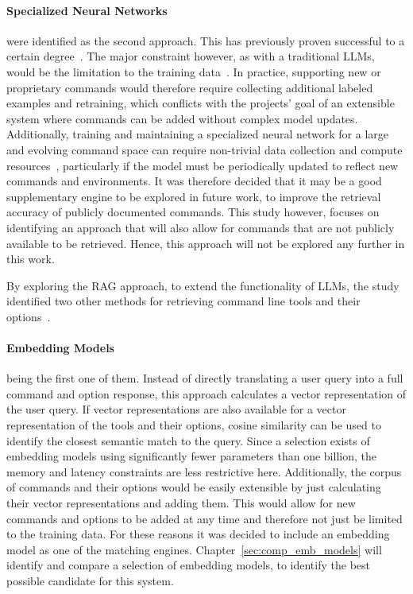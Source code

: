 \paragraph{Specialized Neural Networks} were identified as the second approach. This has previously proven successful to a certain degree~\cite{agarwal2021neurips}. The major constraint however, as with a traditional \acp{LLM}, would be the limitation to the training data~\cite{10488711}. In practice, supporting new or proprietary commands would therefore require collecting additional labeled examples and retraining, which conflicts with the projects' goal of an extensible system where commands can be added without complex model updates. Additionally, training and maintaining a specialized neural network for a large and evolving command space can require non-trivial data collection and compute resources~\cite{thompson2020computational}, particularly if the model must be periodically updated to reflect new commands and environments. It was therefore decided that it may be a good supplementary engine to be explored in future work, to improve the retrieval accuracy of publicly documented commands. This study however, focuses on identifying an approach that will also allow for commands that are not publicly available to be retrieved. Hence, this approach will not be explored any further in this work.

By exploring the \ac{RAG} approach, to extend the functionality of \acp{LLM}, the study identified two other methods for retrieving command line tools and their options~\cite{aljohani2026enhancing,baban2025optimizing}. 

\paragraph{Embedding Models} being the first one of them. Instead of directly translating a user query into a full command and option response, this approach calculates a vector representation of the user query. If vector representations are also available for a vector representation of the tools and their options, cosine similarity can be used to identify the closest semantic match to the query. Since a selection exists of embedding models using significantly fewer parameters than one billion, the memory and latency constraints are less restrictive here. Additionally, the corpus of commands and their options would be easily extensible by just calculating their vector representations and adding them. This would allow for new commands and options to be added at any time and therefore not just be limited to the training data. For these reasons it was decided to include an embedding model as one of the matching engines. Chapter~\ref{sec:comp_emb_models} will identify and compare a selection of embedding models, to identify the best possible candidate for this system.

